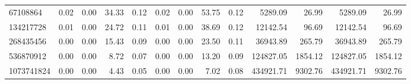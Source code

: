 \begin{tabular}{lrrrrrrrrrrrr}
67108864   &        0.02 &        0.00 &         34.33 &          0.12 &           0.02 &           0.00 &        53.75 &         0.12 &          5289.09 &            26.99 &         5289.09 &           26.99 \\
134217728  &        0.01 &        0.00 &         24.72 &          0.11 &           0.01 &           0.00 &        38.69 &         0.12 &         12142.54 &            96.69 &        12142.54 &           96.69 \\
268435456  &        0.00 &        0.00 &         15.43 &          0.09 &           0.00 &           0.00 &        23.50 &         0.11 &         36943.89 &           265.79 &        36943.89 &          265.79 \\
536870912  &        0.00 &        0.00 &          8.72 &          0.07 &           0.00 &           0.00 &        13.20 &         0.09 &        124827.05 &          1854.12 &       124827.05 &         1854.12 \\
1073741824 &        0.00 &        0.00 &          4.43 &          0.05 &           0.00 &           0.00 &         7.02 &         0.08 &        434921.71 &          9302.76 &       434921.71 &         9302.76 \\
\bottomrule
\end{tabular}

